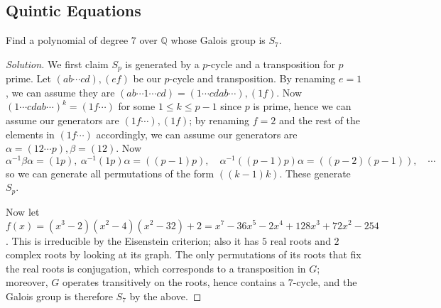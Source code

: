 \documentclass[12pt]{article}
\theoremstyle{remark}
\begin{document}
\subsection{Quintic Equations}
\setcounter{subsubsection}{6}
\begin{problem}
  Find a polynomial of degree $7$ over $\mathbb{Q}$ whose Galois group is $S_7$.
\end{problem}
\begin{proof}[Solution]
  We first claim $S_p$ is generated by a $p$-cycle and a transposition for $p$ prime. Let $(ab \cdots cd),(ef)$ be our $p$-cycle and transposition. By renaming $e=1$, we can assume they are $(ab \cdots 1 \cdots cd) = (1 \cdots cdab \cdots),(1f)$. Now $(1 \cdots cdab \cdots)^k = (1f\cdots)$ for some $1 \le k \le p-1$ since $p$ is prime, hence we can assume our generators are $(1f\cdots),(1f)$; by renaming $f=2$ and the rest of the elements in $(1f\cdots)$ accordingly, we can assume our generators are $\alpha=(12\cdots p),\beta=(12)$. Now
  \begin{equation*}
    \alpha^{-1}\beta\alpha = (1p), ~ \alpha^{-1}(1p)\alpha = ((p-1)p), \quad \alpha^{-1}((p-1)p)\alpha = ((p-2)(p-1)), \quad \cdots
  \end{equation*}
  so we can generate all permutations of the form $((k-1)k)$. These generate $S_p$.
  \par Now let $f(x) = (x^3 - 2) (x^2 - 4) (x^2 - 32) + 2 = x^7-36 x^5-2 x^4+128 x^3+72 x^2-254$. This is irreducible by the Eisenstein criterion; also it has $5$ real roots and $2$ complex roots by looking at its graph. The only permutations of its roots that fix the real roots is conjugation, which corresponds to a transposition in $G$; moreover, $G$ operates transitively on the roots, hence contains a $7$-cycle, and the Galois group is therefore $S_7$ by the above.
\end{proof}
\begingroup
\renewcommand{\thesubsection}{\thesection.\Alph{subsection}}
\setcounter{subsection}{12}
\end{document}
